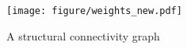\begin{figure}
    \centering
        \texttt{[image: figure/weights\_new.pdf]}
        \caption{A structural connectivity graph}
        \label{figure:special_network}
\end{figure}

